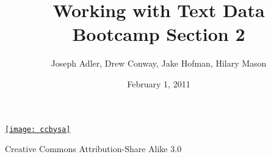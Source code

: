 \documentclass[xcolor=dvipsnames, 9pt]{beamer}
\title{Working with Text Data\\Bootcamp Section 2}
\author{Joseph Adler, Drew Conway, Jake Hofman, Hilary Mason}
\date{February 1, 2011}
\begin{document}
 

\begin{frame}[plain]
  \titlepage 
  
  \tiny
  \href{http://creativecommons.org/licenses/by-sa/3.0/us/}{\texttt{[image: ccbysa]}}

  Creative Commons Attribution-Share Alike 3.0
\end{frame}
\end{document}
